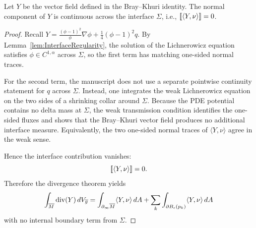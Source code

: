 \begin{lemma}\label{lem:TransmissionGlobal}
Let $Y$ be the vector field defined in the Bray--Khuri identity. The normal component of $Y$ is continuous across the interface $\Sigma$, i.e., $[\![ \langle Y, \nu \rangle ]\!] = 0$.
\end{lemma}
\begin{proof}
Recall $Y = \frac{(\phi-1)^2}{\phi} \nabla \phi + \frac{1}{4}(\phi-1)^2 q$. By Lemma~\ref{lem:InterfaceRegularity}, the solution of the Lichnerowicz equation satisfies $\phi \in C^{1,\alpha}$ across $\Sigma$, so the first term has matching one-sided normal traces.

For the second term, the manuscript does not use a separate pointwise continuity statement for $q$ across $\Sigma$. Instead, one integrates the weak Lichnerowicz equation on the two sides of a shrinking collar around $\Sigma$. Because the PDE potential contains no delta mass at $\Sigma$, the weak transmission condition identifies the one-sided fluxes and shows that the Bray--Khuri vector field produces no additional interface measure. Equivalently, the two one-sided normal traces of $\langle Y,\nu\rangle$ agree in the weak sense.

Hence the interface contribution vanishes:
\begin{equation}
    [\![ \langle Y,\nu\rangle ]\!]=0.
\end{equation}
Therefore the divergence theorem yields
\begin{equation}
    \int_{\overline{M}} \mathrm{div}(Y) \, dV_{\overline{g}} = \int_{\partial_\infty \overline{M}} \langle Y, \nu \rangle \, dA + \sum_k \int_{\partial B_\epsilon(p_k)} \langle Y, \nu \rangle \, dA
\end{equation}
with no internal boundary term from $\Sigma$.
\end{proof}

